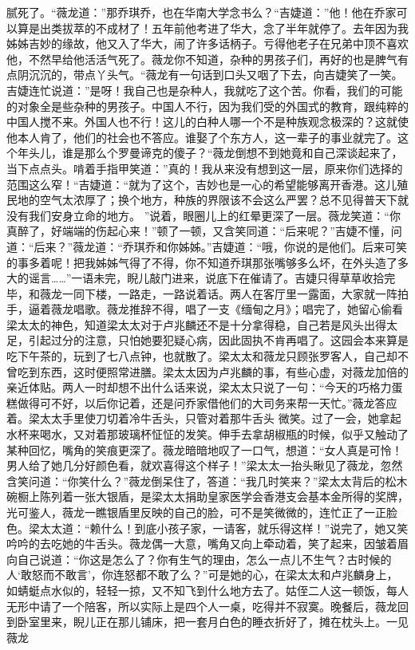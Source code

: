 \documentclass{article}
\begin{document}
\newpage
腻死了。“薇龙道：”那乔琪乔，也在华南大学念书么？“吉婕道：”他！他在乔家可以算是出类拔萃的不成材了！五年前他考进了华大，念了半年就停了。去年因为我姊姊吉妙的缘故，他又入了华大，闹了许多话柄子。亏得他老子在兄弟中顶不喜欢他，不然早给他活活气死了。薇龙你不知道，杂种的男孩子们，再好的也是脾气有点阴沉沉的，带点丫头气。“薇龙有一句话到口头又咽了下去，向吉婕笑了一笑。吉婕连忙说道：”是呀！我自己也是杂种人，我就吃了这个苦。你看，我们的可能的对象全是些杂种的男孩子。中国人不行，因为我们受的外国式的教育，跟纯粹的中国人搅不来。外国人也不行！这儿的白种人哪一个不是种族观念极深的？这就使他本人肯了，他们的社会也不答应。谁娶了个东方人，这一辈子的事业就完了。这个年头儿，谁是那么个罗曼谛克的傻子？“薇龙倒想不到她竟和自己深谈起来了，当下点点头。啃着手指甲笑道：”真的！我从来没有想到这一层，原来你们选择的范围这么窄！“吉婕道：“就为了这个，吉妙也是一心的希望能够离开香港。这儿殖民地的空气太浓厚了；换个地方，种族的界限该不会这么严罢？总不见得普天下就没有我们安身立命的地方。
\newpage
”说着，眼圈儿上的红晕更深了一层。薇龙笑道：“你真醉了，好端端的伤起心来！”顿了一顿，又含笑同道：“后来呢？”吉婕不懂，问道：“后来？”薇龙道：“乔琪乔和你姊姊。”吉婕道：“哦，你说的是他们。后来可笑的事多着呢！把我姊姊气得了不得，你不知道乔琪那张嘴够多么坏，在外头造了多大的谣言……”一语未完，睨儿敲门进来，说底下在催请了。吉婕只得草草收拾完毕，和薇龙一同下楼，一路走，一路说着话。两人在客厅里一露面，大家就一阵拍手，逼着薇龙唱歌。薇龙推辞不得，唱了一支《缅甸之月》；唱完了，她留心偷看梁太太的神色，知道梁太太对于卢兆麟还不是十分拿得稳，自己若是风头出得太足，引起过分的注意，只怕她要犯疑心病，因此固执不肯再唱了。这园会本来算是吃下午茶的，玩到了七八点钟，也就散了。梁太太和薇龙只顾张罗客人，自己却不曾吃到东西，这时便照常进膳。梁太太因为卢兆麟的事，有些心虚，对薇龙加倍的亲近体贴。两人一时却想不出什么话来说，梁太太只说了一句：“今天的巧格力蛋糕做得可不好，以后你记着，还是问乔家借他们的大司务来帮一天忙。”薇龙答应着。梁太太手里使刀切着冷牛舌头，只管对着那牛舌头
\newpage
微笑。过了一会，她拿起水杯来喝水，又对着那玻璃杯怔怔的发笑。伸手去拿胡椒瓶的时候，似乎又触动了某种回忆，嘴角的笑痕更深了。薇龙暗暗地叹了一口气，想道：“女人真是可怜！男人给了她几分好颜色看，就欢喜得这个样子！”梁太太一抬头瞅见了薇龙，忽然含笑问道：“你笑什么？”薇龙倒呆住了，答道：“我几时笑来？”梁太太背后的松木碗橱上陈列着一张大银盾，是梁太太捐助皇家医学会香港支会基本金所得的奖牌，光可鉴人，薇龙一瞧银盾里反映的自己的脸，可不是笑微微的，连忙正了一正脸色。梁太太道：“赖什么！到底小孩子家，一请客，就乐得这样！”说完了，她又笑吟吟的去吃她的牛舌头。薇龙偶一大意，嘴角又向上牵动着，笑了起来，因皱着眉向自己说道：“你这是怎么了？你有生气的理由，怎么一点儿不生气？古时候的人‘敢怒而不敢言’，你连怒都不敢了么？”可是她的心，在梁太太和卢兆麟身上，如蜻蜓点水似的，轻轻一掠，又不知飞到什么地方去了。姑侄二人这一顿饭，每人无形中请了一个陪客，所以实际上是四个人一桌，吃得并不寂寞。晚餐后，薇龙回到卧室里来，睨儿正在那儿铺床，把一套月白色的睡衣折好了，摊在枕头上。一见薇龙
\end{document}
